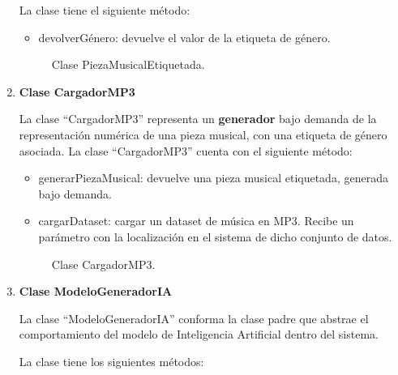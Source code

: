 \begin{enumerate}
  La clase tiene el siguiente método:

  \begin{itemize}
      \item devolverGénero: devuelve el valor de la etiqueta de género.
  \end{itemize}

  \begin{figure}[H]
    \centering
    
    \caption{Clase PiezaMusicalEtiquetada.}
  \end{figure}

  \item \textbf{Clase CargadorMP3}

  La clase ``CargadorMP3'' representa un \textbf{generador} bajo demanda de la representación numérica de una pieza musical, con una etiqueta de género asociada.
  La clase ``CargadorMP3'' cuenta con el siguiente método:

  \begin{itemize}
      \item generarPiezaMusical: devuelve una pieza musical etiquetada, generada bajo demanda.
      \item cargarDataset: cargar un dataset de música en MP3. Recibe un parámetro con la localización en el sistema de dicho conjunto de datos.
  \end{itemize}

  \begin{figure}[H]
    \centering
    
    \caption{Clase CargadorMP3.}
  \end{figure}

  \item \textbf{Clase ModeloGeneradorIA}

  La clase ``ModeloGeneradorIA'' conforma la clase padre que abstrae el comportamiento del modelo de Inteligencia Artificial dentro del sistema.

  La clase tiene los siguientes métodos:


\end{enumerate}
